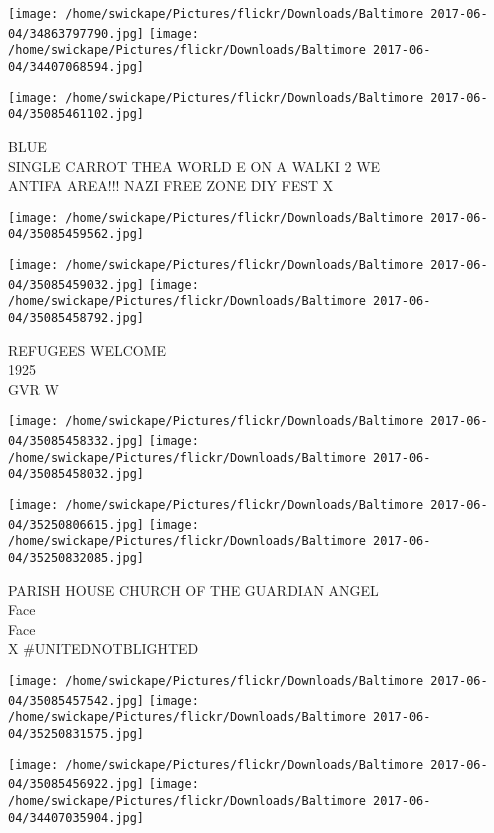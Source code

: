 \documentclass[10pt,letterpaper]{article}
\begin{document}
\texttt{[image: /home/swickape/Pictures/flickr/Downloads/Baltimore 2017-06-04/34863797790.jpg]}
\texttt{[image: /home/swickape/Pictures/flickr/Downloads/Baltimore 2017-06-04/34407068594.jpg]}

\texttt{[image: /home/swickape/Pictures/flickr/Downloads/Baltimore 2017-06-04/35085461102.jpg]}

BLUE\\
SINGLE CARROT THEA WORLD E ON A WALKI 2 WE\\
ANTIFA AREA!!! NAZI FREE ZONE DIY FEST X\\
\pagebreak

\texttt{[image: /home/swickape/Pictures/flickr/Downloads/Baltimore 2017-06-04/35085459562.jpg]}

\vspace{0.25in}
\texttt{[image: /home/swickape/Pictures/flickr/Downloads/Baltimore 2017-06-04/35085459032.jpg]}
\texttt{[image: /home/swickape/Pictures/flickr/Downloads/Baltimore 2017-06-04/35085458792.jpg]}

REFUGEES WELCOME\\
1925\\
GVR W\\
\pagebreak

\texttt{[image: /home/swickape/Pictures/flickr/Downloads/Baltimore 2017-06-04/35085458332.jpg]}
\texttt{[image: /home/swickape/Pictures/flickr/Downloads/Baltimore 2017-06-04/35085458032.jpg]}

\texttt{[image: /home/swickape/Pictures/flickr/Downloads/Baltimore 2017-06-04/35250806615.jpg]}
\texttt{[image: /home/swickape/Pictures/flickr/Downloads/Baltimore 2017-06-04/35250832085.jpg]}

PARISH HOUSE CHURCH OF THE GUARDIAN ANGEL\\
Face\\
Face\\
X \#UNITEDNOTBLIGHTED\\
\pagebreak

\texttt{[image: /home/swickape/Pictures/flickr/Downloads/Baltimore 2017-06-04/35085457542.jpg]}
\texttt{[image: /home/swickape/Pictures/flickr/Downloads/Baltimore 2017-06-04/35250831575.jpg]}

\texttt{[image: /home/swickape/Pictures/flickr/Downloads/Baltimore 2017-06-04/35085456922.jpg]}
\texttt{[image: /home/swickape/Pictures/flickr/Downloads/Baltimore 2017-06-04/34407035904.jpg]}
\end{document}
